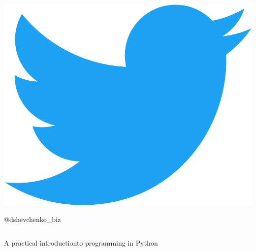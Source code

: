 \documentclass[aspectratio=169]{beamer}
\begin{document}
\begin{frame}
\begin{columns}[c]
\begin{column}[c]{15em}
            \begin{minipage}{1.5em}
                \includegraphics[scale=0.02]{img/twitter.png}
            \end{minipage}
            \begin{minipage}{6em}
                \large
                    @dshevchenko\_biz
            \end{minipage}

            \vspace{5em}
        \end{column}
    \end{columns}
\end{frame}

\begin{frame}
    \HUGE
        A practical introduction\newline to  programming in Python
\end{frame}
\end{document}
